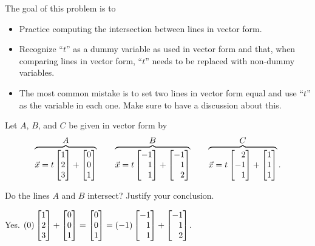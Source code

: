 \documentclass{workbook}
\newcommand{\bookonlynewpage}{\begin{bookonly}\newpage\end{bookonly}}
\begin{document}
\begin{slide}
	\bookonlynewpage
	\question
	\begin{annotation}
		\begin{goals}

			The goal of this problem is to
			\begin{itemize}
				\item Practice computing the intersection between lines
					in vector form.
				\item Recognize ``$t$'' as a dummy variable as used
					in vector form and that, when comparing lines in
					vector form, ``$t$'' needs to be replaced with
					non-dummy variables.
			\end{itemize}
		\end{goals}

		\begin{notes}
			\begin{itemize}
				\item The most common mistake is to set two lines
					in vector form equal and use ``$t$'' as
					the variable in each one. Make sure to have a discussion
					about this.
			\end{itemize}
		\end{notes}
	\end{annotation}
	Let $A$, $B$, and $C$ be given in vector form by
	\[
	\overbrace{\vec x=t\mat{1\\2\\3}+\mat{0\\0\\1}}^{\displaystyle A}
	\qquad \overbrace{\vec x=t\mat{-1\\1\\1}+\mat{-1\\1\\2}}^{\displaystyle B}
	\qquad \overbrace{\vec x=t\mat{2\\-1\\1}+\mat{1\\1\\1}}^{\displaystyle C}.
	\]
	\begin{parts}
		\item Do the lines $A$ and $B$ intersect? Justify your conclusion.
			\begin{solution}
				Yes. $(0)\mat{1\\2\\3}+\mat{0\\0\\1} = \mat{0\\0\\1} = (-1)\mat{-1\\1\\1}+\mat{-1\\1\\2}$.


\end{solution}
\end{parts}
\end{slide}
\end{document}
